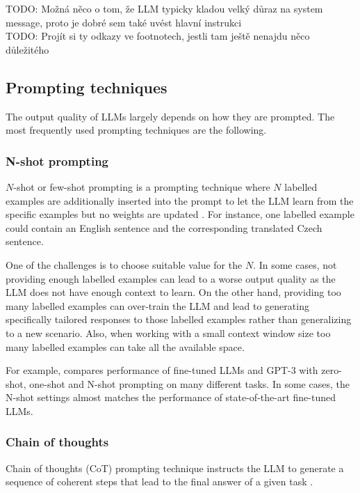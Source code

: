 TODO: Možná něco o tom, že LLM typicky kladou velký důraz na system message, proto je dobré sem také uvést hlavní instrukci \\

TODO: Projít si ty odkazy ve footnotech, jestli tam ještě nenajdu něco důležitého \\


\subsection{Prompting techniques}

The output quality of LLMs largely depends on how they are prompted. The most frequently used prompting techniques are the following.


\subsubsection{N-shot prompting}

$N$-shot or few-shot prompting is a prompting technique where $N$ labelled examples are additionally inserted into the prompt to let the LLM learn from the specific examples but no weights are updated \cite{Brown2020}. For instance, one labelled example could contain an English sentence and the corresponding translated Czech sentence.

One of the challenges is to choose suitable value for the $N$. In some cases, not providing enough labelled examples can lead to a worse output quality as the LLM does not have enough context to learn. On the other hand, providing too many labelled examples can over-train the LLM and lead to generating specifically tailored responses to those labelled examples rather than generalizing to a new scenario. Also, when working with a small context window size too many labelled examples can take all the available space.

For example, \citet{Brown2020} compares performance of fine-tuned LLMs and GPT-3 with zero-shot, one-shot and N-shot prompting on many different tasks. In some cases, the N-shot settings almost matches the performance of state-of-the-art fine-tuned LLMs.


\subsubsection{Chain of thoughts}

Chain of thoughts (CoT) prompting technique instructs the LLM to generate a sequence of coherent steps that lead to the final answer of a given task \cite{Wei2022}.

